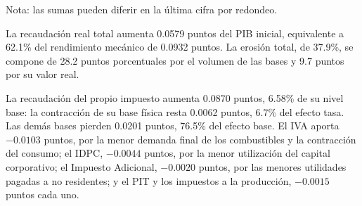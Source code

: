 \documentclass[11pt]{article}
\begin{document}
\begin{table}[H]
\centering
\caption{Recaudación y descomposición del impacto fiscal del aumento de los impuestos específicos a los combustibles (porcentaje y puntos del PIB nominal inicial)}
\label{tab:tesp-descomposicion}
\small
{}
\par\smallskip
\begin{minipage}{\textwidth}
\footnotesize Nota: las sumas pueden diferir en la última cifra por redondeo.
\end{minipage}
\end{table}

La recaudación real total aumenta 0.0579 puntos del PIB inicial, equivalente a 62.1\% del rendimiento mecánico de 0.0932 puntos. La erosión total, de 37.9\%, se compone de 28.2 puntos porcentuales por el volumen de las bases y 9.7 puntos por su valor real.

La recaudación del propio impuesto aumenta 0.0870 puntos, 6.58\% de su nivel base: la contracción de su base física resta 0.0062 puntos, 6.7\% del efecto tasa. Las demás bases pierden 0.0201 puntos, 76.5\% del efecto base. El IVA aporta $-0.0103$ puntos, por la menor demanda final de los combustibles y la contracción del consumo; el IDPC, $-0.0044$ puntos, por la menor utilización del capital corporativo; el Impuesto Adicional, $-0.0020$ puntos, por las menores utilidades pagadas a no residentes; y el PIT y los impuestos a la producción, $-0.0015$ puntos cada uno.
\end{document}

